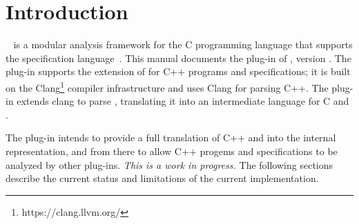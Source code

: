 \chapter{Introduction}

\framac~\cite{userman,fac15} is a modular analysis framework for the C
programming language that supports the \acsl specification
language~\cite{acsl}. This manual documents the \fclang plug-in of \framac,
version \fclangversion. 
The \fclang plug-in supports the \acslpp extension of \acsl for C++ programs and specifications; 
it is built on the Clang\footnote{https://clang.llvm.org/} compiler infrastructure and uses Clang for 
parsing C++. The plug-in extends clang to parse \acslpp, translating it into an intermediate language for C and \acsl.

The \fclang plug-in intends to provide a full translation of C++ and \acslpp into the \framac internal representation, and from there to allow C++ progems and \acslpp specifications to be analyzed by other \framac plug-ins. 
\textit{This is a work in progress.}
The following sections describe the current status and limitations of the current implementation.

